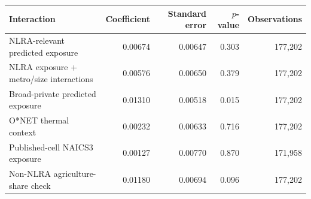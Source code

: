 \begin{tabular}{lrrrr}
\toprule
Interaction & Coefficient & Standard error & $p$-value & Observations \\
\midrule
NLRA-relevant predicted exposure & 0.00674 & 0.00647 & 0.303 & 177,202 \\
NLRA exposure + metro/size interactions & 0.00576 & 0.00650 & 0.379 & 177,202 \\
Broad-private predicted exposure & 0.01310 & 0.00518 & 0.015 & 177,202 \\
O*NET thermal context & 0.00232 & 0.00633 & 0.716 & 177,202 \\
Published-cell NAICS3 exposure & 0.00127 & 0.00770 & 0.870 & 171,958 \\
Non-NLRA agriculture-share check & 0.01180 & 0.00694 & 0.096 & 177,202 \\
\bottomrule
\end{tabular}
